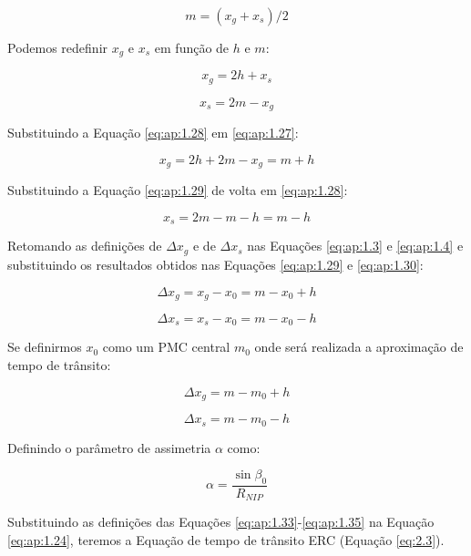 \begin{equation}
 \label{eq:ap:1.26}
 m=(x_g + x_s)/2
\end{equation}

Podemos redefinir $x_g$ e $x_s$ em função de $h$ e $m$:

\begin{equation}
 \label{eq:ap:1.27}
 x_g = 2h + x_s
\end{equation}

\begin{equation}
 \label{eq:ap:1.28}
 x_s = 2m - x_g
\end{equation}

Substituindo a Equação \ref{eq:ap:1.28} em \ref{eq:ap:1.27}:

\begin{equation}
 \label{eq:ap:1.29}
 x_g = 2h + 2m - x_g = m + h
\end{equation}

Substituindo a Equação \ref{eq:ap:1.29} de volta em \ref{eq:ap:1.28}:

\begin{equation}
 \label{eq:ap:1.30}
 x_s = 2m - m -h = m - h
\end{equation}

Retomando as definições de $\Delta x_g$ e de $\Delta x_s$ nas Equações \ref{eq:ap:1.3} e \ref{eq:ap:1.4}
e substituindo os resultados obtidos nas Equações \ref{eq:ap:1.29} e \ref{eq:ap:1.30}:

\begin{equation}
 \label{eq:ap:1.31}
 \Delta x_g = x_g - x_0 = m - x_0 + h
\end{equation}

\begin{equation}
 \label{eq:ap:1.32}
 \Delta x_s = x_s - x_0 = m - x_0 - h
\end{equation}

Se definirmos $x_0$ como um PMC central $m_0$ onde será realizada a aproximação de tempo de trânsito:

\begin{equation}
 \label{eq:ap:1.33}
 \Delta x_g = m - m_0 + h
\end{equation}

\begin{equation}
 \label{eq:ap:1.34}
 \Delta x_s = m - m_0 - h
\end{equation}

Definindo o parâmetro de assimetria $\alpha$ como:

\begin{equation}
 \label{eq:ap:1.35}
 \alpha = \frac{\sin \beta_0}{R_{NIP}}
\end{equation}

Substituindo as definições das Equações \ref{eq:ap:1.33}-\ref{eq:ap:1.35} na
Equação \ref{eq:ap:1.24}, teremos a Equação de tempo de trânsito ERC (Equação \ref{eq:2.3}).